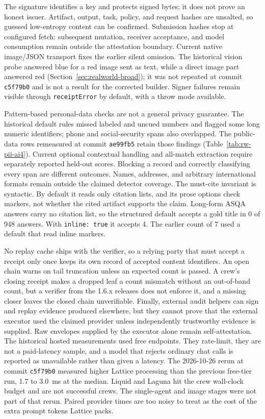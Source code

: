 \documentclass[conference]{IEEEtran}
\newcommand{\code}[1]{\texttt{\small #1}}
\begin{document}
The signature identifies a key and protects signed bytes; it does not prove an honest
issuer. Artifact, output, task, policy, and request hashes are unsalted, so guessed
low-entropy content can be confirmed. Submission hashes stop at configured fetch:
subsequent mutation, receiver acceptance, and model consumption remain outside the
attestation boundary. Current native image/JSON transport fixes the earlier silent
omission. The historical vision probe answered blue for a red image sent as text,
while a direct image part answered red (Section~\ref{sec:realworld-broad}); it was not
repeated at commit \code{c5f79b0} and is not a result for the corrected builder.
Signer failures remain visible through \code{receiptError} by default, with a throw
mode available.

Pattern-based personal-data checks are not a general privacy guarantee. The historical
default rules missed labeled and uncued numbers and flagged some long numeric
identifiers; phone and social-security spans also overlapped. The public-data rows
remeasured at commit \code{ae99fb5} retain those findings
(Table~\ref{tab:rw-pii-ai4}). Current optional contextual handling and all-match
extraction require separately reported held-out scores. Blocking a record and correctly
classifying every span are different outcomes. Names, addresses, and arbitrary
international formats remain outside the claimed detector coverage.
The must-cite invariant is syntactic. By default it reads
only citation lists, and its prose options check markers, not whether the cited
artifact supports the claim. Long-form ASQA answers carry no citation list, so the
structured default accepts a gold title in 0 of 948 answers. With \code{inline:~true}
it accepts 4. The earlier count of 7 used a default that read inline markers.

No replay cache ships with the verifier, so a relying party that must accept a receipt
only once keeps its own record of accepted content identifiers. An open chain warns on
tail truncation unless an expected count is passed. A crew's closing receipt makes a
dropped leaf a count mismatch without an out-of-band count, but a verifier from the
1.6.x releases does not enforce it, and a missing closer leaves the closed chain
unverifiable. Finally, external audit helpers can sign and replay evidence produced
elsewhere, but they cannot prove that the external executor used the claimed provider
unless independently trustworthy evidence is supplied. Raw envelopes supplied by the
executor alone remain self-attestation. The historical hosted measurements used
free endpoints. They rate-limit, they are not a paid-latency sample, and a model that
rejects ordinary chat calls is reported as unavailable rather than given a latency.
The 2026-10-26 rerun at commit \code{c5f79b0} measured higher Lattice processing than
the previous free-tier run, 1.7 to 3.0~ms at the median. Liquid and Laguna hit the
crew wall-clock budget and are not successful crews. The single-agent and image
stages were not part of that rerun.
Paired provider times are too noisy to treat as the cost of the extra prompt tokens
Lattice packs.
\end{document}
